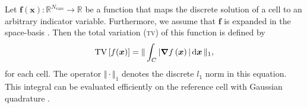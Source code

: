 Let $\bm{f}(\bm{x}): \mathbb{R}^{N_\text{vars}} \to \mathbb{R}$ be a function that maps the discrete solution of a cell to an arbitrary indicator variable.
Furthermore, we assume that $\bm{f}$ is expanded in the space-basis .
Then the total variation (\textsc{tv}) of this function is defined by
\newcommand{\tv}{\operatorname{TV}}
\begin{equation}
  \label{eq:tv}
  \tv \left[ f(\bm{x}) \right] =
  \Vert
\intdcell{ \vert \gradient{f \left( \bm{x} \right)} \vert }
\Vert_1
,
\end{equation}
for each cell.
The operator $\Vert \cdot \Vert_1$ denotes the discrete $l_1$ norm in this equation.
This integral can be evaluated efficiently on the reference cell  with Gaussian quadrature .

